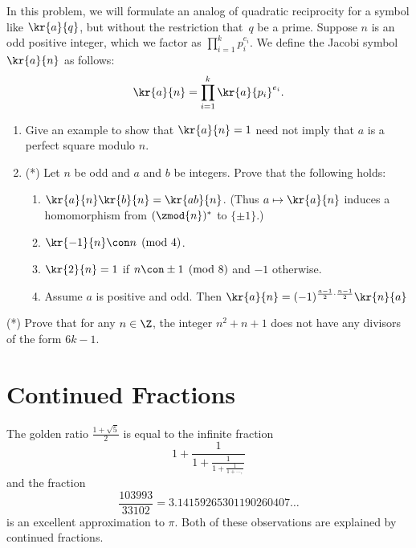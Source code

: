 \begin{exercises}
\item\label{ex:rec13} In this problem, we will formulate an analog of
  quadratic reciprocity for a symbol like $\kr{a}{q}$, but without the
  restriction that~$q$ be a prime.  Suppose $n$ is an odd positive integer,
  which we factor as $\prod_{i=1}^k p_i^{e_i}$.  We
  define the Jacobi symbol $\kr{a}{n}$ as follows:
  $$
  \kr{a}{n} = \prod_{i=1}^k \kr{a}{p_i}^{e_i}.
  $$
\begin{enumerate}
\item Give an example to show that $\kr{a}{n}=1$ need not imply that
  $a$ is a perfect square modulo $n$.
\item (*) Let $n$ be odd and $a$ and $b$ be integers.  Prove that the
  following holds:
\begin{enumerate}
\item $\kr{a}{n}\kr{b}{n} = \kr{ab}{n}$. (Thus $a\mapsto \kr{a}{n}$
  induces a homomorphism from $(\zmod{n})^*$ to $\{\pm 1\}$.)
\item $\kr{-1}{n} \con n \pmod{4}$.
\item $\kr{2}{n}=1$ if $n\con \pm 1\pmod{8}$ and $-1$ otherwise.
\item Assume $a$ is positive and odd.  Then $\kr{a}{n} =
  (-1)^{\frac{a-1}{2} \cdot \frac{n-1}{2}} \kr{n}{a}$
\end{enumerate}
\end{enumerate}

\item\label{ex:rec14}(*) Prove that for any $n\in\Z$, the integer
  $n^2+n+1$ does not have any divisors of the form $6k-1$.

\end{exercises}



\chapter{Continued Fractions}\label{ch:contfrac}

The golden ratio
$\frac{1+\sqrt{5}}{2}$ is
equal to the infinite fraction
$$
1+ \frac{\displaystyle 1}{\displaystyle 1+ \frac{\displaystyle 1}{\displaystyle 1 +
\frac{1}{1 + \cdots,}}}
$$
and the fraction
$$
\frac{103993}{33102}=3.14159265301190260407\ldots
$$
is an excellent approximation to $\pi$.
Both of these observations are explained by continued fractions.

